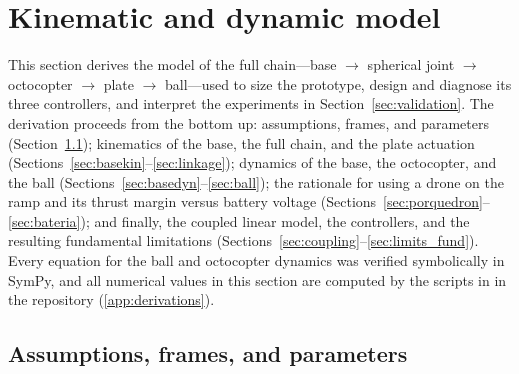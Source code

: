 \section{Kinematic and dynamic model}
\label{sec:model}

This section derives the model of the full chain---base $\to$ spherical joint $\to$ octocopter $\to$ plate $\to$ ball---used to size the prototype, design and diagnose its three controllers, and interpret the experiments in Section~\ref{sec:validation}. The derivation proceeds from the bottom up: assumptions, frames, and parameters (Section~\ref{sec:assumptions}); kinematics of the base, the full chain, and the plate actuation (Sections~\ref{sec:basekin}--\ref{sec:linkage}); dynamics of the base, the octocopter, and the ball (Sections~\ref{sec:basedyn}--\ref{sec:ball}); the rationale for using a drone on the ramp and its thrust margin versus battery voltage (Sections~\ref{sec:porquedron}--\ref{sec:bateria}); and finally, the coupled linear model, the controllers, and the resulting fundamental limitations (Sections~\ref{sec:coupling}--\ref{sec:limits_fund}). Every equation for the ball and octocopter dynamics was verified symbolically in SymPy, and all numerical values in this section are computed by the scripts in  in the repository (\ref{app:derivations}).

\subsection{Assumptions, frames, and parameters}
\label{sec:assumptions}

